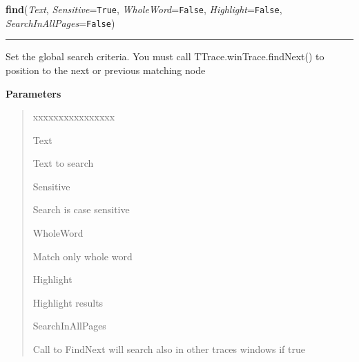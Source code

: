 \hspace{.8\funcindent}\begin{boxedminipage}{\funcwidth}

    \raggedright \textbf{find}(\textit{Text}, \textit{Sensitive}={\tt True}, \textit{WholeWord}={\tt False}, \textit{Highlight}={\tt False}, \textit{SearchInAllPages}={\tt False})

    \vspace{-1.5ex}

    \rule{\textwidth}{0.5\fboxrule}
\setlength{\parskip}{2ex}
    Set the global search criteria. You must call 
    TTrace.winTrace.findNext() to position to the next or previous matching
    node

\setlength{\parskip}{1ex}
      \textbf{Parameters}
      \vspace{-1ex}

      \begin{quote}
        \begin{Ventry}{xxxxxxxxxxxxxxxx}

          \item[Text]

          Text to search

          \item[Sensitive]

          Search is case sensitive

          \item[WholeWord]

          Match only whole word

          \item[Highlight]

          Highlight results

          \item[SearchInAllPages]

          Call to FindNext will search also in other traces windows if true

        \end{Ventry}

      \end{quote}

    \end{boxedminipage}

    \label{tracetool:TTrace:closeViewer}

    \vspace{0.5ex}

